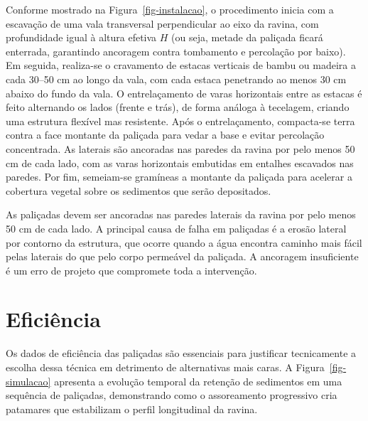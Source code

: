 \documentclass[
  portuguese,
  11pt,
  a4paper,
  open=any]{scrbook}
\begin{document}
Conforme mostrado na Figura~\ref{fig-instalacao}, o procedimento inicia
com a escavação de uma vala transversal perpendicular ao eixo da ravina,
com profundidade igual à altura efetiva \(H\) (ou seja, metade da
paliçada ficará enterrada, garantindo ancoragem contra tombamento e
percolação por baixo). Em seguida, realiza-se o cravamento de estacas
verticais de bambu ou madeira a cada 30--50 cm ao longo da vala, com
cada estaca penetrando ao menos 30 cm abaixo do fundo da vala. O
entrelaçamento de varas horizontais entre as estacas é feito alternando
os lados (frente e trás), de forma análoga à tecelagem, criando uma
estrutura flexível mas resistente. Após o entrelaçamento, compacta-se
terra contra a face montante da paliçada para vedar a base e evitar
percolação concentrada. As laterais são ancoradas nas paredes da ravina
por pelo menos 50 cm de cada lado, com as varas horizontais embutidas em
entalhes escavados nas paredes. Por fim, semeiam-se gramíneas a montante
da paliçada para acelerar a cobertura vegetal sobre os sedimentos que
serão depositados.

\begin{tcolorbox}[enhanced jigsaw, leftrule=.75mm, colframe=quarto-callout-important-color-frame, colback=white, bottomrule=.15mm, opacityback=0, colbacktitle=quarto-callout-important-color!10!white, breakable, bottomtitle=1mm, opacitybacktitle=0.6, title=\textcolor{quarto-callout-important-color}{\faExclamation}\hspace{0.5em}{Ponto crítico}, titlerule=0mm, toprule=.15mm, toptitle=1mm, rightrule=.15mm, left=2mm, arc=.35mm, coltitle=black]

As paliçadas devem ser ancoradas nas paredes laterais da ravina por pelo
menos 50 cm de cada lado. A principal causa de falha em paliçadas é a
erosão lateral por contorno da estrutura, que ocorre quando a água
encontra caminho mais fácil pelas laterais do que pelo corpo permeável
da paliçada. A ancoragem insuficiente é um erro de projeto que
compromete toda a intervenção.

\end{tcolorbox}

\section{Eficiência}\label{eficiuxeancia}

Os dados de eficiência das paliçadas são essenciais para justificar
tecnicamente a escolha dessa técnica em detrimento de alternativas mais
caras. A Figura~\ref{fig-simulacao} apresenta a evolução temporal da
retenção de sedimentos em uma sequência de paliçadas, demonstrando como
o assoreamento progressivo cria patamares que estabilizam o perfil
longitudinal da ravina.
\end{document}
